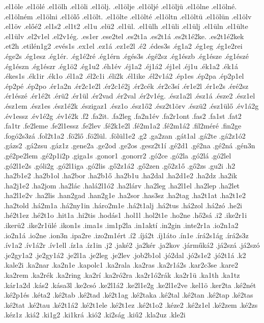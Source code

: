 {.el1öle
.el1ölé
.el1ölh
.el1öli
.el1ölj.
.el1ölje
.el1öljé
.el1öljü
.el1ölne
.el1ölné.
.el1ölném
.el1ölni
.el1ölő
.el1ölt.
.el1ölte
.el1ölté
.el1öltn
.el1öltü
.el1ölün
.el1ölv
.el1öv
.előé2
.el1s2
.el1t2
.el1u
.elü2
.el1ül.
.el1ülh
.el1üli
.el1ülj
.el1üln
.el1ülte
.el1ülv
.el2v1el
.el2v1ég.
.es1er
.ese2tel
.es2t1a
.es2t1á
.es2t1é2ke.
.es2t1é2kek
.et2h
.etilén1g2
.evés1s
.ex1el
.ez1á
.ez1e2l
.é2
.édes3s
.ég1a2
.ég1eg
.ég1e2rei
.ége2s
.ég1esz
.ég1ér.
.ég1é2ré
.ég1érn
.égés3s
.égé2sz
.ég1észb
.ég1észe
.ég1észé
.ég1észn
.ég1észr
.ég1ö2
.ég1u2
.éh1év
.éj1a2
.éj1á2
.éj1el
.éj1u
.ék1a2
.ék1á
.ékes1s
.ék1ir
.ék1o
.él1a2
.él2c1i
.éli2k
.él1ike
.él2v1á2
.ép1es
.ép2pa
.ép2p1el
.ép2pé
.ép2po
.ér1a2n
.ér2c1e2l
.ér2c1é2j
.ér2cék
.ér2c3sí
.ér1e2l
.ér1e2s
.éré2sz
.ér1észé
.ér1é2t
.érü2
.ér1ül
.ér2vad
.ér2val
.ér2v1ég.
.ész1a2l
.ész1á
.észe2
.ész1el
.ész1em
.ész1es
.ész1é2k
.észigaz1
.ész1o
.ész1ő2
.ész2t1örv
.észü2
.ész1ülő
.év1á2g
.év1essz
.év1é2g
.év1é2k
.f2
.fa2it.
.fa2leg
.fa2n1év
.fa2r1ont
.fas2
.fa1st
.fat2
.fa1tr
.fe2leme
.fe2l1essz
.fe2lev
.fé2k1e2l
.fé2m1a2
.fé2m1á2
.fil2méré
.fin2ge
.fogó2s3zá
.fol2t1a2
.fö2lő
.fö2lül.
.fölül1e2
.g2
.ga2zan
.gát1al
.gá2te
.gá2z1ó2
.gázs2
.gá2zsu
.gáz1z
.gene2a
.ge2od
.ge2os
.gesz2t1í
.gé2d1
.gé2na
.gé2ná
.gén3n
.gé2pe2lem
.gé2p1i2p
.giga1s
.gonor1
.gonorr2
.gó2ce
.gó2la
.gó2lá
.gó2lel
.gó2l1e2s
.góli2g
.gó2l1iga
.gó2lis
.gő2z1á2
.gő2zen
.gő2z1ő
.gő2zs
.gu2i
.h2
.ha2b1e2
.ha2b1ol
.ha2bor
.ha2b1ő
.ha2b1u
.ha2dal
.ha2d1e2
.ha2dz
.ha2ik
.ha2j1e2
.ha2jom
.ha2lác
.halá2l1ó2
.ha2lárv
.ha2leg
.ha2l1el
.ha2lep
.ha2let
.ha2l1e2v
.ha2lis
.han2gad
.han2g1e
.ha2sor
.has3sz
.ha2tag
.ha2t1at
.ha2t1e2
.ha2told
.há2m1a
.há2ny1in
.háro2m1e
.há2t1alj
.há2tus
.há2zol
.há2zó
.he2i
.hé2t1ez
.hé2t1o
.hit1a
.hi2tis
.hodás1
.hol1l
.hol2t1e
.ho2ne
.hő2sá
.i2
.ike2r1i
.ikerü2
.ike2r1ülé
.ikon1s
.ima1s
.im1p2la
.in1aktí
.in2gin
.inte2r1a
.io2n1a2
.io2n1á
.io2ne
.ion3n
.ipa2re
.izo2m1ért
.í2
.íjá2t
.íj1áto
.ín1e
.írá2s1ág
.írá2s3z
.ív1a2
.ív1á2r
.ív1ell
.íz1a
.íz1in
.j2
.jaké2
.ja2kér
.ja2kov
.járműká2
.já2szá
.já2szó
.je2gy1a2
.je2gy1á2
.je2l1a
.je2leg
.je2lev
.job2b1ol
.jó2dal
.jó2s1e2
.jó2t1á
.k2
.kale2i
.ka2nar
.ka2n1e
.kapolc1
.ka2rala
.ka2ras
.ka2r1á2s
.kar2c3se
.kare2
.ka2rem
.ka2rék
.ka2ring
.ka2rí
.ka2ró2ra
.ka2r1ó2rák
.ka2r1ü
.ka1th
.ka1tz
.kár1a2d
.kás2
.kása3l
.ke2csó
.ke2l1á2
.ke2l1e2g
.ke2l1e2ve
.kel1ö
.ker2ta
.ké2nét
.ké2p1és
.kéta2
.ké2tab
.ké2tad
.ké2t1ag
.ké2taka
.ké2tal
.ké2tan
.ké2tap
.ké2tas
.ké2tat
.ké2tau
.ké2t1á2
.ké2t1ele
.ké2t1ez
.ké2t1o2
.kéze2
.ké2z1el
.ké2zem
.ké2zs
.kéz1z
.kiá2
.ki1g2
.ki1krá
.kió2
.ki2ság
.kiű2
.kla2uz
.kle2i
}
